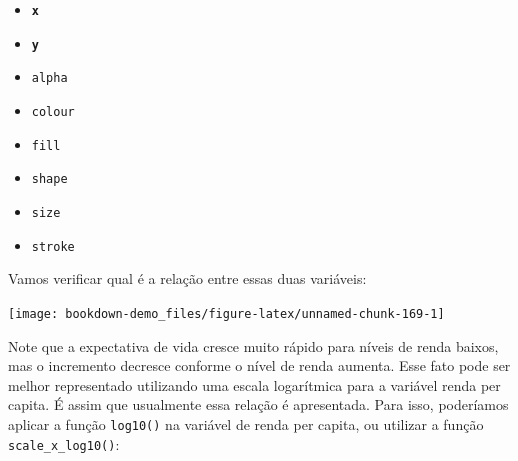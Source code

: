 \documentclass[]{book}
\newenvironment{Shaded}{\begin{snugshade}}{\end{snugshade}}
\newcommand{\KeywordTok}[1]{\textcolor[rgb]{0.13,0.29,0.53}{\textbf{#1}}}
\newcommand{\DataTypeTok}[1]{\textcolor[rgb]{0.13,0.29,0.53}{#1}}
\newcommand{\DecValTok}[1]{\textcolor[rgb]{0.00,0.00,0.81}{#1}}
\newcommand{\StringTok}[1]{\textcolor[rgb]{0.31,0.60,0.02}{#1}}
\newcommand{\OperatorTok}[1]{\textcolor[rgb]{0.81,0.36,0.00}{\textbf{#1}}}
\newcommand{\NormalTok}[1]{#1}
\providecommand{\tightlist}{%
  \setlength{\itemsep}{0pt}\setlength{\parskip}{0pt}}
\begin{document}
\begin{itemize}
\tightlist
\item
  \textbf{\texttt{x}}
\item
  \textbf{\texttt{y}}
\item
  \texttt{alpha}
\item
  \texttt{colour}
\item
  \texttt{fill}
\item
  \texttt{shape}
\item
  \texttt{size}
\item
  \texttt{stroke}
\end{itemize}

Vamos verificar qual é a relação entre essas duas variáveis:

\begin{Shaded}
\end{Shaded}

\begin{center}\texttt{[image: bookdown-demo\_files/figure-latex/unnamed-chunk-169-1]} \end{center}

Note que a expectativa de vida cresce muito rápido para níveis de renda
baixos, mas o incremento decresce conforme o nível de renda aumenta.
Esse fato pode ser melhor representado utilizando uma escala logarítmica
para a variável renda per capita. É assim que usualmente essa relação é
apresentada. Para isso, poderíamos aplicar a função \texttt{log10()} na
variável de renda per capita, ou utilizar a função
\texttt{scale\_x\_log10()}:
\end{document}
